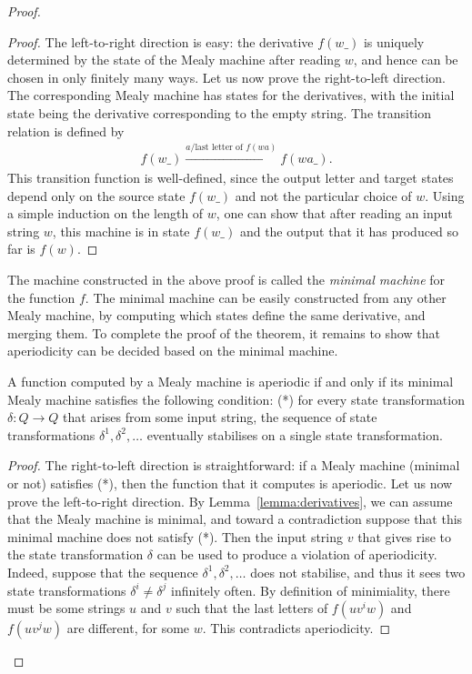 \begin{proof}
    \begin{proof}
        The left-to-right direction is easy: the derivative $f(w\_)$ is uniquely determined by the state of the Mealy machine after reading $w$, and hence can be chosen in only finitely many ways. Let us now prove the right-to-left direction. The corresponding Mealy machine has states for the derivatives, with the initial state being the derivative corresponding to the empty string. The transition relation is defined by
        \begin{align*}
        f(w\_) \xrightarrow {a / \text{last letter of $f(wa)$}} f(wa\_).
        \end{align*}
        This transition function is well-defined, since the output letter and target states depend only on the source state $f(w\_)$ and not the particular choice of $w$. Using a simple induction on the length of $w$, one can show that after reading an input string $w$, this machine is in state $f(w\_)$ and the output that it has produced so far is $f(w)$.
    \end{proof}

    The machine constructed in the above proof is called the \emph{minimal machine} for the function $f$. The minimal machine can be easily constructed from any other Mealy machine, by computing which states define the same derivative, and merging them. To complete the proof of the theorem, it remains to show that aperiodicity can be decided based on the minimal machine.

    \begin{lemma}\label{lem:aperiodicity-minimal-machine}
        A function computed by a  Mealy machine is aperiodic if and only if its minimal Mealy machine satisfies the following condition: (*) for every state transformation $\delta : Q \to Q$ that arises from some input string, the    sequence of state transformations $\delta^1, \delta^2,\ldots$  eventually stabilises on a single state transformation.
    \end{lemma}

    \begin{proof} The right-to-left direction is straightforward: if a Mealy machine (minimal or not) satisfies (*), then the function that it computes is aperiodic. 
        Let us now prove the left-to-right direction. By Lemma~\ref{lemma:derivatives}, we can assume that the Mealy machine is minimal, and toward a contradiction suppose that this minimal machine does not satisfy (*). Then the input string $v$  that gives rise to the state transformation $\delta$ can be used to produce a violation of aperiodicity. Indeed, suppose that the sequence $\delta^1, \delta^2,\ldots$ does not stabilise, and thus it sees two state transformations $\delta^i \neq  \delta^j$ infinitely often. By definition of minimiality, there must be some strings $u$ and $v$ such that the last letters of $f(uv^iw)$ and $f(uv^jw)$ are different, for some $w$. This contradicts aperiodicity.
    \end{proof}


\end{proof}
